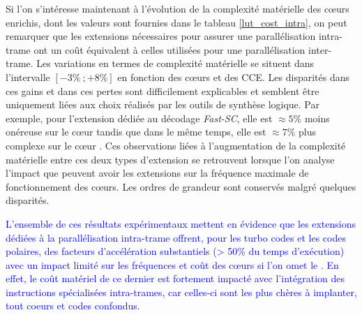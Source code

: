 \documentclass[../main.tex]{subfiles}
\begin{document}
Si l'on s'intéresse maintenant à l'évolution de la complexité matérielle des cœurs enrichis, dont les valeurs sont fournies dans le tableau \ref{lut_cost_intra}, on peut remarquer que les extensions nécessaires pour assurer une parallélisation intra-trame ont un coût équivalent à celles utilisées pour une parallélisation inter-trame. 
Les variations en termes de complexité matérielle se situent dans l'intervalle $[-3\%\ ; +8\%]$ en fonction des cœurs et des CCE. 
Les disparités dans ces gains et dans ces pertes sont difficilement explicables et semblent être uniquement liées aux choix réalisés par les outils de synthèse logique. 
Par exemple, pour l'extension dédiée au décodage \textit{Fast-SC}, elle est $\approx 5\%$ moins onéreuse sur le cœur \PicoRV\space tandis que dans le même temps, elle est $\approx 7\%$ plus complexe sur le cœur \IBEX.
Ces observations liées à l'augmentation de la complexité matérielle entre ces deux types d'extension se retrouvent lorsque l'on analyse l'impact que peuvent avoir les extensions sur la fréquence maximale de fonctionnement des cœurs. 
Les ordres de grandeur sont conservés malgré quelques disparités.

\textcolor{blue}{L'ensemble de ces résultats expérimentaux mettent en évidence que les extensions dédiées à la parallélisation intra-trame offrent, pour les turbo codes et les codes polaires, des facteurs d'accélération substantiels (> 50\% du temps d'exécution) avec un impact limité sur les fréquences et coût des cœurs si l'on omet le \PicoRV. 
En effet, le coût matériel de ce dernier est fortement impacté avec l'intégration des instructions spécialisées intra-trames, car celles-ci sont les plus chères à implanter, tout coeurs et codes confondus.}




%
%
%
%
\end{document}

